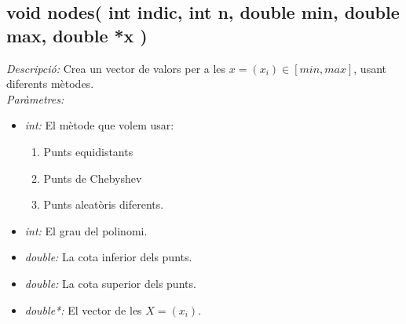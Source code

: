 \documentclass[a4paper,10pt, notitlepage]{article}
\begin{document}
\subsection{void nodes( int indic, int n, double min, double max, double *x )}
\textit{Descripció: }
  Crea un vector de valors per a les $x = (x_i) \in [min, max]$, usant diferents mètodes.
\\\textit{Paràmetres: }\begin{itemize}[label={--}]
  \item \textit{int: } El mètode que volem usar:
  \begin{enumerate}[label=\arabic*.]
      \item Punts equidistants
      \item Punts de Chebyshev
      \item Punts aleatòris diferents.
  \end{enumerate}
  \item \textit{int: } El grau del polinomi.
  \item \textit{double: } La cota inferior dels punts.
  \item \textit{double: } La cota superior dels punts.
  \item \textit{double*: } El vector de les $X = (x_i)$.
\end{itemize}
\end{document}
